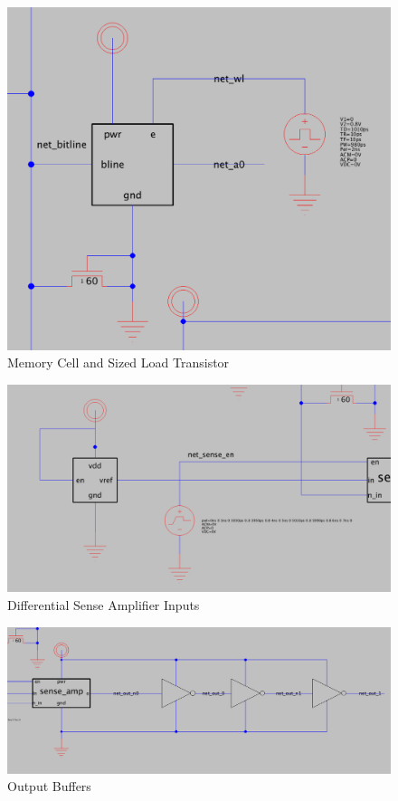 \documentclass[a4paper]{article}
\begin{document}
\begin{figure}[H]
	\centering
	\includegraphics[scale=0.3]{exampleBitlineMemoryCell}
	\caption{Memory Cell and Sized Load Transistor}
	\label{fig:bitlineMemCell}
\end{figure}

\begin{figure}[H]
	\centering
	\includegraphics[scale=0.25]{exampleBitlineSenseInputs}
	\caption{Differential Sense Amplifier Inputs}
	\label{fig:bitlineSenseInputs}
\end{figure}

\begin{figure}[H]
	\centering
	\includegraphics[scale=0.3]{exampleBitlineOutputs}
	\caption{Output Buffers}
	\label{fig:bitlineOutputs}
\end{figure}
\end{document}
